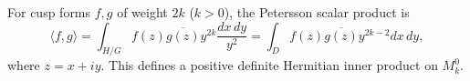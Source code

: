 For cusp forms $f, g$ of weight $2k$ ($k > 0$), the Petersson scalar product is
$$\langle f, g \rangle = \int_{H/G} f(z)\overline{g(z)} y^{2k} \frac{dx\,dy}{y^2} = \int_D f(z)\overline{g(z)} y^{2k-2} dx\,dy,$$
where $z = x + iy$. This defines a positive definite Hermitian inner product on $M_k^0$.
